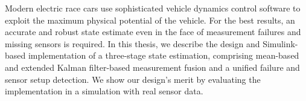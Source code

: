 Modern electric race cars use sophisticated vehicle dynamics control software to exploit the maximum physical potential of the vehicle. For the best results, an accurate and robust state estimate even in the face of measurement failures and missing sensors is required. In this thesis, we describe the design and Simulink-based implementation of a three-stage state estimation, comprising mean-based and extended Kalman filter-based measurement fusion and a unified failure and sensor setup detection. We show our design's merit by evaluating the implementation in a simulation with real sensor data.
